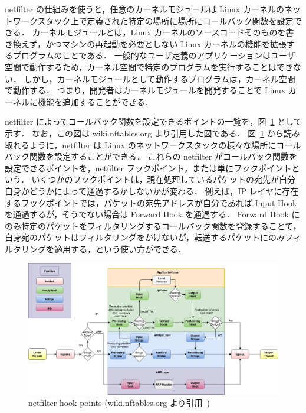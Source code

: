 netfilter の仕組みを使うと，任意のカーネルモジュールは Linux カーネルのネットワークスタック上で定義された特定の場所に場所にコールバック関数を設定できる．
カーネルモジュールとは，Linux カーネルのソースコードそのものを書き換えず，かつマシンの再起動を必要としない Linux カーネルの機能を拡張するプログラムのことである．
一般的なユーザ定義のアプリケーションはユーザ空間で動作するため，カーネル空間で特定のプログラムを実行することはできない．
しかし，カーネルモジュールとして動作するプログラムは，カーネル空間で動作する．
つまり，開発者はカーネルモジュールを開発することで Linux カーネルに機能を追加することができる．

netfilter によってコールバック関数を設定できるポイントの一覧を，図~\ref*{fig:nf-hooks} として示す．
なお，この図は wiki.nftables.org より引用した図である．
図~\ref*{fig:nf-hooks} から読み取れるように，netfilter は Linux のネットワークスタックの様々な場所にコールバック関数を設定することができる．
これらの netfilter がコールバック関数を設定できるポイントを，netfilter フックポイント，または単にフックポイントという．
いくつかのフックポイントは，現在処理しているパケットの宛先が自分自身かどうかによって通過するかしないかが変わる．
例えば，IP レイヤに存在するフックポイントでは，パケットの宛先アドレスが自分であれば Input Hook を通過するが，そうでない場合は Forward Hook を通過する．
Forward Hook にのみ特定のパケットをフィルタリングするコールバック関数を登録することで，自身宛のパケットはフィルタリングをかけないが，転送するパケットにのみフィルタリングを適用する，という使い方ができる．

\begin{figure}[t]
    \centering
    \includegraphics[width=0.95\linewidth]{img/nf-hooks.pdf}
    \caption{netfilter hook points (wiki.nftables.org より引用~\cite{nf-hooks})}
    \label{fig:nf-hooks}
\end{figure}

